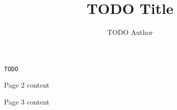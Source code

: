 \documentclass[a4paper, 11pt, twocolumn]{article}
\title{TODO Title}
\author{TODO Author}
\begin{document}
\makeatletter %

\pagestyle{fancy}
\setlength{\headheight}{13.59999pt}
\fancyhead{} %
\fancyhead[HL]{\@author}
\fancyhead[HC]{\textbf \@title}
\fancyhead[HR]{\@date}

\begin{lstlisting}[title=TODO]
TODO
\end{lstlisting}

\pagebreak

Page 2 content

\pagebreak

Page 3 content
\end{document}
